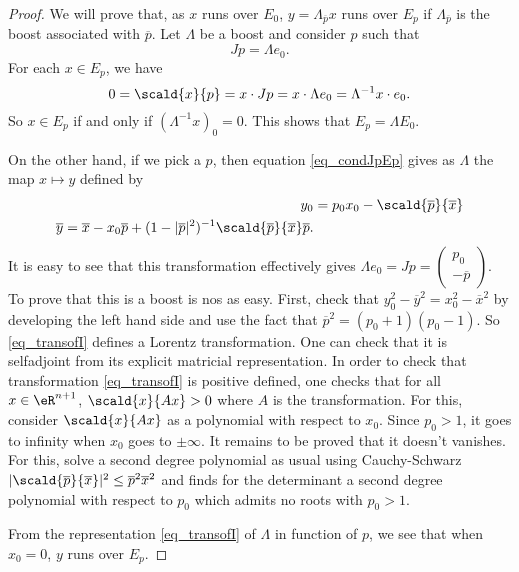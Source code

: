 \begin{proof}
We will prove that, as $x$ runs over $E_0$, $y=\Lambda_{\overline{p}}x$ runs over $E_p$ if $\Lambda_{\overline{p}}$ is the boost associated with $\overline{p}$. Let $\Lambda$ be a boost and consider $p$ such that
\begin{equation}  \label{eq_condJpEp}
Jp=\Lambda e_0.
\end{equation}
For each $x\in E_p$, we have
\[
  0=\scald{ x }{ p }=x\cdot Jp=x\cdot\Lambda e_0=\Lambda^{-1}x\cdot e_0.
\]
So $x\in E_p$ if and only if $(\Lambda^{-1}x)_0=0$. This shows that $E_p=\Lambda E_0$.

On the other hand, if we pick a $p$, then equation \eqref{eq_condJpEp} gives as $\Lambda$ the map $x\mapsto y$ defined by
 \begin{subequations} \label{eq_transofI}
\begin{align}
  y_0&=p_0x_0-\scald{ \overline{p} }{ \overline{x} }\\
\overline{ y }=\overline{x}-x_0\overline{p}+(1-|\overline{p}|^2)^{-1}\scald{ \overline{p} }{ \overline{x} }\overline{p}.
\end{align}
\end{subequations}
It is easy to see that this transformation effectively gives $\Lambda e_0=Jp=
\begin{pmatrix}
p_0\\-\overline{p}
\end{pmatrix}
$. To prove that this is a boost is nos as easy. First, check that $y_0^2-\overline{ y }^2=x_0^2-\overline{x}^2$ by developing the left hand side and use the fact that $\overline{p}^2=(p_0+1)(p_0-1)$. So \eqref{eq_transofI} defines a Lorentz transformation. One can check that it is selfadjoint from its explicit matricial representation. In order to check that transformation \eqref{eq_transofI} is positive defined, one checks that for all $x\in\eR^{n+1}$,  $\scald{ x }{ Ax }>0$ where $A$ is the transformation. For this, consider $\scald{ x }{ Ax }$ as a polynomial with respect to $x_0$. Since $p_0>1$, it goes to infinity when $x_0$ goes to $\pm\infty$. It remains to be proved that it doesn't vanishes. For this, solve a second degree polynomial as usual using Cauchy-Schwarz $| \scald{ \overline{p} }{ \overline{x} } |^2\leq \overline{p}^2\overline{x}^2$ and finds for the determinant a second degree polynomial with respect to $p_0$ which admits no roots with $p_0>1$.

From the representation \eqref{eq_transofI} of $\Lambda$ in function of $p$, we see that when $x_0=0$, $y$ runs over $E_p$.

\end{proof}

